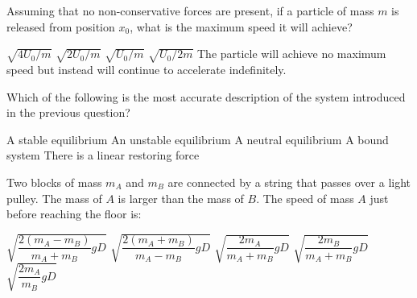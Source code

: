 \documentclass{../../../oss-classkick-exam}
\begin{document}
\begin{multicols*}{2}
\begin{questions}
    \question Assuming that no non-conservative forces are present, if a
    particle of mass $m$ is released from position $x_0$, what is the maximum
    speed it will achieve?
    \label{q:well1}
    \begin{choices}
      \choice $\sqrt{4U_0/m}$
      \choice $\sqrt{2U_0/m}$
      \choice $\sqrt{U_0/m}$
      \choice $\sqrt{U_0/2m}$
      \choice The particle will achieve no maximum speed but instead will
      continue to accelerate indefinitely.
    \end{choices}
    \vspace{.7in}
    
    \question Which of the following is the most accurate description of the
    system introduced in the previous question?
    \label{q:well2}
    \begin{choices}
      \choice A stable equilibrium
      \choice An unstable equilibrium
      \choice A neutral equilibrium
      \choice A bound system
      \choice There is a linear restoring force
    \end{choices}
    \vspace{.7in}
    
    \question Two blocks of mass $m_A$ and $m_B$ are connected by a string that
    passes over a light pulley. The mass of $A$ is larger than the mass of $B$.
    The speed of mass $A$ just before reaching the floor is:
    \begin{center}
    \end{center}
    \begin{choices}
      \choice $\sqrt{\dfrac{2(m_A-m_B)}{m_A+m_B}gD}$
      \choice $\sqrt{\dfrac{2(m_A+m_B)}{m_A-m_B}gD}$
      \choice $\sqrt{\dfrac{2m_A}{m_A+m_B}gD}$
      \choice $\sqrt{\dfrac{2m_B}{m_A+m_B}gD}$
      \choice $\sqrt{\dfrac{2m_A}{m_B}gD}$
    \end{choices}
    \columnbreak


\end{questions}
\end{multicols*}
\end{document}
